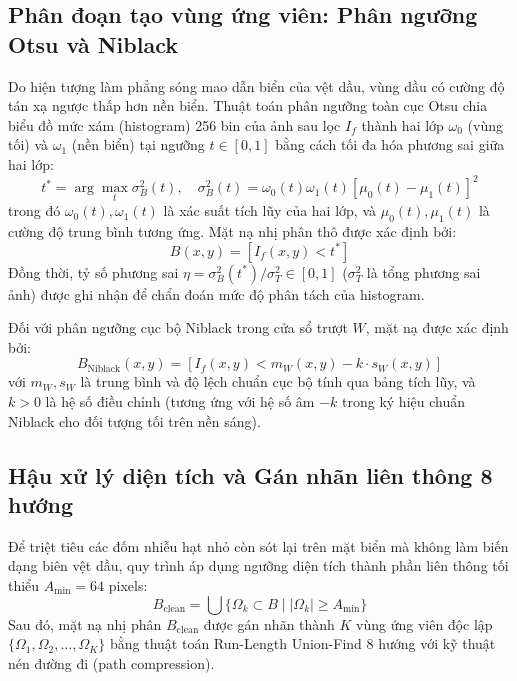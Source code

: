 \subsection{Phân đoạn tạo vùng ứng viên: Phân ngưỡng Otsu và Niblack}
\label{subsec:otsu_threshold}
Do hiện tượng làm phẳng sóng mao dẫn biển của vệt dầu, vùng dầu có cường độ tán xạ ngược thấp hơn nền biển. Thuật toán phân ngưỡng toàn cục Otsu chia biểu đồ mức xám (histogram) 256 bin của ảnh sau lọc $I_f$ thành hai lớp $\omega_0$ (vùng tối) và $\omega_1$ (nền biển) tại ngưỡng $t \in [0, 1]$ bằng cách tối đa hóa phương sai giữa hai lớp:
\begin{equation}
t^* = \arg\max_{t} \sigma_B^2(t), \quad \sigma_B^2(t) = \omega_0(t)\omega_1(t) [\mu_0(t) - \mu_1(t)]^2
\label{eq:otsu_between}
\end{equation}
trong đó $\omega_0(t), \omega_1(t)$ là xác suất tích lũy của hai lớp, và $\mu_0(t), \mu_1(t)$ là cường độ trung bình tương ứng. Mặt nạ nhị phân thô được xác định bởi:
\begin{equation}
B(x, y) = [I_f(x, y) < t^*]
\end{equation}
Đồng thời, tỷ số phương sai $\eta = \sigma_B^2(t^*) / \sigma_T^2 \in [0, 1]$ ($\sigma_T^2$ là tổng phương sai ảnh) được ghi nhận để chẩn đoán mức độ phân tách của histogram.

Đối với phân ngưỡng cục bộ Niblack trong cửa sổ trượt $W$, mặt nạ được xác định bởi:
\begin{equation}
B_{\text{Niblack}}(x, y) = [I_f(x, y) < m_W(x, y) - k \cdot s_W(x, y)]
\label{eq:niblack_formula}
\end{equation}
với $m_W, s_W$ là trung bình và độ lệch chuẩn cục bộ tính qua bảng tích lũy, và $k > 0$ là hệ số điều chỉnh (tương ứng với hệ số âm $-k$ trong ký hiệu chuẩn Niblack cho đối tượng tối trên nền sáng).

\subsection{Hậu xử lý diện tích và Gán nhãn liên thông 8 hướng}
\label{subsec:morphology_cca}
Để triệt tiêu các đốm nhiễu hạt nhỏ còn sót lại trên mặt biển mà không làm biến dạng biên vệt dầu, quy trình áp dụng ngưỡng diện tích thành phần liên thông tối thiểu $A_{\min} = 64$ pixels:
\begin{equation}
B_{\text{clean}} = \bigcup \{ \Omega_k \subset B \mid |\Omega_k| \ge A_{\min} \}
\end{equation}
Sau đó, mặt nạ nhị phân $B_{\text{clean}}$ được gán nhãn thành $K$ vùng ứng viên độc lập $\{\Omega_1, \Omega_2, \dots, \Omega_K\}$ bằng thuật toán Run-Length Union-Find 8 hướng với kỹ thuật nén đường đi (path compression).

